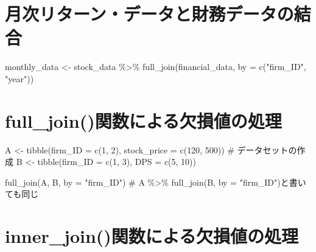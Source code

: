 \documentclass[
  letterpaper,
  DIV=11,
  numbers=noendperiod]{scrreprt}
\newenvironment{Shaded}{\begin{snugshade}}{\end{snugshade}}
\newcommand{\AttributeTok}[1]{\textcolor[rgb]{0.40,0.45,0.13}{#1}}
\newcommand{\CommentTok}[1]{\textcolor[rgb]{0.37,0.37,0.37}{#1}}
\newcommand{\DecValTok}[1]{\textcolor[rgb]{0.68,0.00,0.00}{#1}}
\newcommand{\FunctionTok}[1]{\textcolor[rgb]{0.28,0.35,0.67}{#1}}
\newcommand{\NormalTok}[1]{\textcolor[rgb]{0.00,0.23,0.31}{#1}}
\newcommand{\OtherTok}[1]{\textcolor[rgb]{0.00,0.23,0.31}{#1}}
\newcommand{\SpecialCharTok}[1]{\textcolor[rgb]{0.37,0.37,0.37}{#1}}
\newcommand{\StringTok}[1]{\textcolor[rgb]{0.13,0.47,0.30}{#1}}
\begin{document}
\section{月次リターン・データと財務データの結合}\label{ux6708ux6b21ux30eaux30bfux30fcux30f3ux30c7ux30fcux30bfux3068ux8ca1ux52d9ux30c7ux30fcux30bfux306eux7d50ux5408}

\begin{Shaded}
\begin{Highlighting}[]
\NormalTok{monthly\_data  }\OtherTok{\textless{}{-}}\NormalTok{ stock\_data }\SpecialCharTok{\%\textgreater{}\%}
  \FunctionTok{full\_join}\NormalTok{(financial\_data, }\AttributeTok{by =} \FunctionTok{c}\NormalTok{(}\StringTok{"firm\_ID"}\NormalTok{, }\StringTok{"year"}\NormalTok{))}
\end{Highlighting}
\end{Shaded}

\section{full\_join()関数による欠損値の処理}\label{full_joinux95a2ux6570ux306bux3088ux308bux6b20ux640dux5024ux306eux51e6ux7406}

\begin{Shaded}
\begin{Highlighting}[]
\NormalTok{A }\OtherTok{\textless{}{-}} \FunctionTok{tibble}\NormalTok{(}\AttributeTok{firm\_ID =} \FunctionTok{c}\NormalTok{(}\DecValTok{1}\NormalTok{, }\DecValTok{2}\NormalTok{), }\AttributeTok{stock\_price =} \FunctionTok{c}\NormalTok{(}\DecValTok{120}\NormalTok{, }\DecValTok{500}\NormalTok{)) }\CommentTok{\# データセットの作成}
\NormalTok{B }\OtherTok{\textless{}{-}} \FunctionTok{tibble}\NormalTok{(}\AttributeTok{firm\_ID =} \FunctionTok{c}\NormalTok{(}\DecValTok{1}\NormalTok{, }\DecValTok{3}\NormalTok{), }\AttributeTok{DPS =} \FunctionTok{c}\NormalTok{(}\DecValTok{5}\NormalTok{, }\DecValTok{10}\NormalTok{))}

\FunctionTok{full\_join}\NormalTok{(A, B, }\AttributeTok{by =} \StringTok{"firm\_ID"}\NormalTok{) }\CommentTok{\# A \%\textgreater{}\% full\_join(B, by = "firm\_ID")と書いても同じ}
\end{Highlighting}
\end{Shaded}

\section{inner\_join()関数による欠損値の処理}\label{inner_joinux95a2ux6570ux306bux3088ux308bux6b20ux640dux5024ux306eux51e6ux7406}
\end{document}
